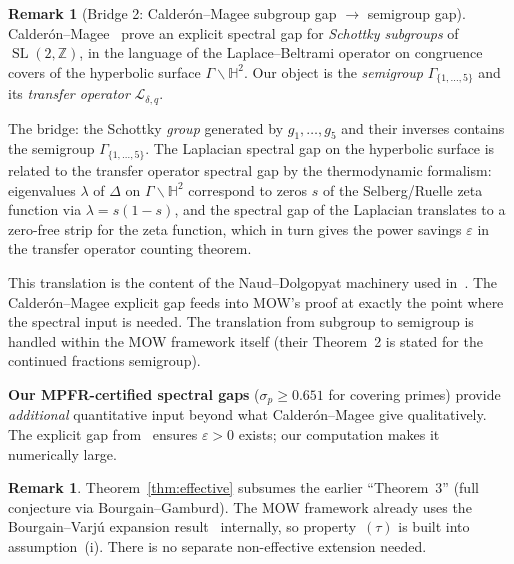 \documentclass[11pt,a4paper]{amsart}
\theoremstyle{definition}
\newtheorem{remark}[theorem]{Remark}
\DeclareMathOperator{\SL}{SL}
\begin{document}
\begin{remark}[Bridge 2: Calder\'on--Magee subgroup gap $\to$ semigroup gap]\label{rem:bridge2}
Calder\'on--Magee~\cite{CM2025} prove an explicit spectral gap for \emph{Schottky subgroups} of $\SL(2, \mathbb{Z})$, in the language of the Laplace--Beltrami operator on congruence covers of the hyperbolic surface $\Gamma \backslash \mathbb{H}^2$. Our object is the \emph{semigroup} $\Gamma_{\{1,\ldots,5\}}$ and its \emph{transfer operator} $\mathcal{L}_{\delta,q}$.

The bridge: the Schottky \emph{group} generated by $g_1, \ldots, g_5$ and their inverses contains the semigroup $\Gamma_{\{1,\ldots,5\}}$. The Laplacian spectral gap on the hyperbolic surface is related to the transfer operator spectral gap by the thermodynamic formalism: eigenvalues $\lambda$ of $\Delta$ on $\Gamma \backslash \mathbb{H}^2$ correspond to zeros $s$ of the Selberg/Ruelle zeta function via $\lambda = s(1-s)$, and the spectral gap of the Laplacian translates to a zero-free strip for the zeta function, which in turn gives the power savings $\varepsilon$ in the transfer operator counting theorem.

This translation is the content of the Naud--Dolgopyat machinery used in~\cite{MOW2019}. The Calder\'on--Magee explicit gap feeds into MOW's proof at exactly the point where the spectral input is needed. The translation from subgroup to semigroup is handled within the MOW framework itself (their Theorem~2 is stated for the continued fractions semigroup).

\textbf{Our MPFR-certified spectral gaps} ($\sigma_p \geq 0.651$ for covering primes) provide \emph{additional} quantitative input beyond what Calder\'on--Magee give qualitatively. The explicit gap from~\cite{CM2025} ensures $\varepsilon > 0$ exists; our computation makes it numerically large.
\end{remark}

\begin{remark}
Theorem~\ref{thm:effective} subsumes the earlier ``Theorem~3'' (full conjecture via Bourgain--Gamburd). The MOW framework already uses the Bourgain--Varj\'u expansion result~\cite{BG2008} internally, so property~$(\tau)$ is built into assumption~(i). There is no separate non-effective extension needed.
\end{remark}
\end{document}
